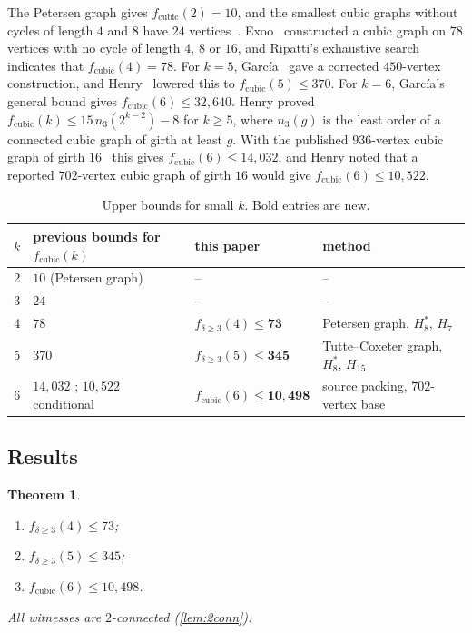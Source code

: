 \documentclass[11pt]{amsart}
\newtheorem{theorem}{Theorem}[section]
\theoremstyle{definition}
\theoremstyle{remark}
\newcommand{\fd}{f_{\delta\ge 3}}
\newcommand{\fc}{f_{\mathrm{cubic}}}
\newcommand{\Hseven}{H_7}
\newcommand{\Hfifteen}{H_{15}}
\newcommand{\Height}{H_8^{*}}
\begin{document}
The Petersen graph gives $\fc(2)=10$, and the smallest cubic graphs without
cycles of length $4$ and $8$ have $24$ vertices~\cite{Markstrom2004,Garcia2026}.
Exoo~\cite{Exoo2014} constructed a cubic graph on $78$ vertices with no cycle
of length $4$, $8$ or $16$, and Ripatti's exhaustive search~\cite{Ripatti2017}
indicates that $\fc(4)=78$. For $k=5$, García~\cite{Garcia2026} gave a
corrected $450$-vertex construction, and Henry~\cite{Henry2026} lowered this to
$\fc(5)\le 370$. For $k=6$, García's general bound gives $\fc(6)\le 32{,}640$.
Henry proved $\fc(k)\le 15\,n_3(2^{k-2})-8$ for $k\ge 5$, where $n_3(g)$ is the
least order of a connected cubic graph of girth at least $g$. With the published
$936$-vertex cubic graph of girth $16$~\cite{EGJSV2026} this gives
$\fc(6)\le 14{,}032$, and Henry noted that a reported $702$-vertex cubic graph of
girth $16$ would give $\fc(6)\le 10{,}522$.

\begin{table}[ht]
\centering
\caption{Upper bounds for small $k$. Bold entries are new.}
\label{tab:summary}
\begin{tabular}{@{}rlll@{}}
\toprule
$k$ & previous bounds for $\fc(k)$ & this paper & method\\
\midrule
2 & $10$ (Petersen graph) & -- & --\\
3 & $24$ \cite{Markstrom2004,Garcia2026} & -- & --\\
4 & $78$ \cite{Exoo2014,Ripatti2017} & $\fd(4)\le\mathbf{73}$ & Petersen graph, $\Height$, $\Hseven$\\
5 & $370$ \cite{Henry2026} & $\fd(5)\le\mathbf{345}$ & Tutte--Coxeter graph, $\Height$, $\Hfifteen$\\
6 & $14{,}032$ \cite{Henry2026}; $10{,}522$ conditional \cite{Henry2026} & $\fc(6)\le\mathbf{10{,}498}$ & source packing, $702$-vertex base\\
\bottomrule
\end{tabular}
\end{table}

\subsection*{Results}
\begin{theorem}\label{thm:main}
\leavevmode
\begin{enumerate}[label=\textup{(\roman*)}]
  \item $\fd(4)\le 73$;
  \item $\fd(5)\le 345$;
  \item $\fc(6)\le 10{,}498$.
\end{enumerate}
All witnesses are $2$-connected (\cref{lem:2conn}).
\end{theorem}
\end{document}
